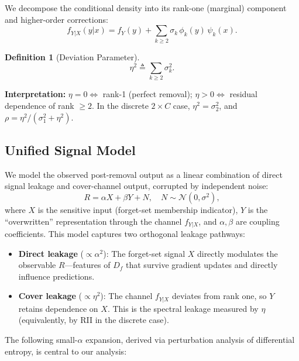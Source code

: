 \documentclass[journal]{IEEEtran}
\theoremstyle{definition}
\newtheorem{definition}[theorem]{Definition}
\newcommand{\coloneqq}{\triangleq}
\begin{document}
We decompose the conditional density into its rank-one (marginal) component and higher-order corrections:
\begin{equation}
f_{Y|X}(y|x) = f_Y(y) + \sum_{k\ge 2} \sigma_k\,\phi_k(y)\,\psi_k(x).
\label{eq:decomp}
\end{equation}

\begin{definition}[Deviation Parameter]
\begin{equation}
\boxed{\eta^2 \coloneqq \sum_{k\ge 2} \sigma_k^2.}
\label{eq:eta}
\end{equation}
\end{definition}

\textbf{Interpretation:} $\eta = 0 \iff$ rank-1 (perfect removal); $\eta > 0 \iff$ residual dependence of rank $\ge 2$. In the discrete $2\times C$ case, $\eta^2 = \sigma_2^2$, and $\rho = \eta^2/(\sigma_1^2 + \eta^2)$.

\subsection{Unified Signal Model}

We model the observed post-removal output as a linear combination of direct signal leakage and cover-channel output, corrupted by independent noise:
\begin{equation}
R = \alpha X + \beta Y + N, \quad N \sim \mathcal{N}(0, \sigma^2),
\label{eq:signal_model}
\end{equation}
where $X$ is the sensitive input (forget-set membership indicator), $Y$ is the ``overwritten'' representation through the channel $f_{Y|X}$, and $\alpha, \beta$ are coupling coefficients. This model captures two orthogonal leakage pathways:

\begin{itemize}
\item \textbf{Direct leakage} ($\propto \alpha^2$): The forget-set signal $X$ directly modulates the observable $R$---features of $D_f$ that survive gradient updates and directly influence predictions.
\item \textbf{Cover leakage} ($\propto \eta^2$): The channel $f_{Y|X}$ deviates from rank one, so $Y$ retains dependence on $X$. This is the spectral leakage measured by $\eta$ (equivalently, by RII in the discrete case).
\end{itemize}

The following small-$\alpha$ expansion, derived via perturbation analysis of differential entropy, is central to our analysis:
\end{document}
